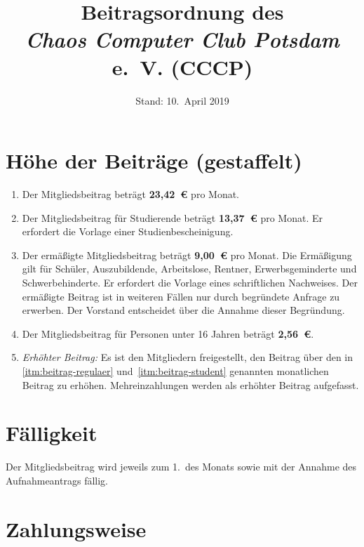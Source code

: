 \documentclass[a4paper, 10pt, headings=normal]{scrartcl}
\title{Beitragsordnung des \\ \emph{Chaos Computer Club Potsdam} e.~V. (CCCP)}
\author{Stand: 10.~April 2019}%
\date{}
\begin{document}
\maketitle
{}

\thispagestyle{empty}

\begin{multicols*}{2}

\section{Höhe der Beiträge (gestaffelt)}

\begin{enumerate}[label={(\arabic*)}]
	\item
		\label{itm:beitrag-regulaer}
		Der Mitgliedsbeitrag beträgt \textbf{23,42~€} pro Monat.
	\item
		\label{itm:beitrag-student}
		Der Mitgliedsbeitrag für Studierende beträgt \textbf{13,37~€} pro Monat.
		Er erfordert die Vorlage einer Studienbescheinigung.
	\item
		Der ermäßigte Mitgliedsbeitrag beträgt \textbf{9,00~€} pro Monat.
		Die Ermäßigung gilt für Schüler, Auszubildende, Arbeitslose, Rentner, Erwerbsgeminderte und Schwerbehinderte.
		Er erfordert die Vorlage eines schriftlichen Nachweises.
		Der ermäßigte Beitrag ist in weiteren Fällen nur durch begründete Anfrage zu erwerben.
		Der Vorstand entscheidet über die Annahme dieser Begründung.
	\item
		Der Mitgliedsbeitrag für Personen unter 16 Jahren beträgt \textbf{2,56~€}.
	\item
		\emph{Erhöhter Beitrag:} Es ist den Mitgliedern freigestellt, den Beitrag über den in \ref{itm:beitrag-regulaer} und~\ref{itm:beitrag-student} genannten monatlichen Beitrag zu erhöhen.
		Mehreinzahlungen werden als erhöhter Beitrag aufgefasst.
\end{enumerate}

\section{Fälligkeit}

Der Mitgliedsbeitrag wird jeweils zum 1.~des Monats sowie mit der Annahme des Aufnahmeantrags fällig.

\section{Zahlungsweise}


\end{multicols*}
\end{document}

